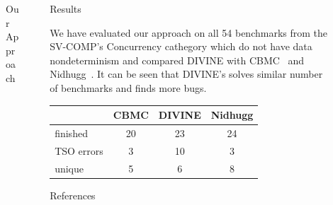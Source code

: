 \documentclass[final, 20pt, a0]{beamer}
\newlength{\sepwid}
\newlength{\marginwid}
\newlength{\onecolwid}
\newlength{\twocolwid}
\newcommand{\divine}{\mbox{DIVINE}\xspace}
\begin{document}
\begin{frame}[t]
\begin{columns}[t]
\begin{column}{\twocolwid}
\begin{columns}[t,totalwidth=\twocolwid]
\begin{column}{\onecolwid}
\begin{block}{Our Approach}
\end{block}


\end{column} %

\begin{column}{\sepwid}\end{column} %
\begin{column}{\onecolwid}

\begin{block}{Results}

We have evaluated our approach on all 54 benchmarks from the SV-COMP's
Concurrency cathegory which do not have data nondeterminism and compared \divine
with CBMC~\cite{Clarke2004} and Nidhugg~\cite{Abdulla2015}. It can be seen that
\divine's solves similar number of benchmarks and finds more bugs.

\begingroup
\bigskip
\centering
\setlength\tabcolsep{0.5em} %
\renewcommand{\arraystretch}{1.1} %
\begin{tabular}{l|ccc}
               & CBMC & DIVINE & Nidhugg \\ \hline
    finished   & 20   & 23     & 24 \\
    TSO errors &  3   & 10     &  3 \\
    unique     &  5   &  6     &  8
\end{tabular}
\endgroup
\end{block}

\begin{block}{References}
\small


\end{block}


\end{column} %

\end{columns} %

\end{column} %

\begin{column}{\sepwid}\end{column} %

\begin{column}{\marginwid}\end{column} %

\end{columns} %

\end{frame} %
\end{document}
